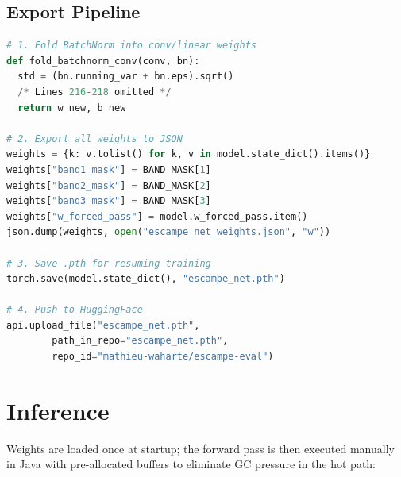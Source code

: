 \documentclass[11pt,a4paper]{article}
\begin{document}
\subsection{Export Pipeline}
\begin{lstlisting}[language=Python]
# 1. Fold BatchNorm into conv/linear weights
def fold_batchnorm_conv(conv, bn):
  std = (bn.running_var + bn.eps).sqrt()
  /* Lines 216-218 omitted */
  return w_new, b_new

# 2. Export all weights to JSON
weights = {k: v.tolist() for k, v in model.state_dict().items()}
weights["band1_mask"] = BAND_MASK[1]
weights["band2_mask"] = BAND_MASK[2]
weights["band3_mask"] = BAND_MASK[3]
weights["w_forced_pass"] = model.w_forced_pass.item()
json.dump(weights, open("escampe_net_weights.json", "w"))

# 3. Save .pth for resuming training
torch.save(model.state_dict(), "escampe_net.pth")

# 4. Push to HuggingFace
api.upload_file("escampe_net.pth",
        path_in_repo="escampe_net.pth",
        repo_id="mathieu-waharte/escampe-eval")
\end{lstlisting}

\clearpage
\section{Inference}

Weights are loaded once at startup; the forward pass is then executed manually in Java with pre-allocated buffers to eliminate GC pressure in the hot path:
\end{document}
